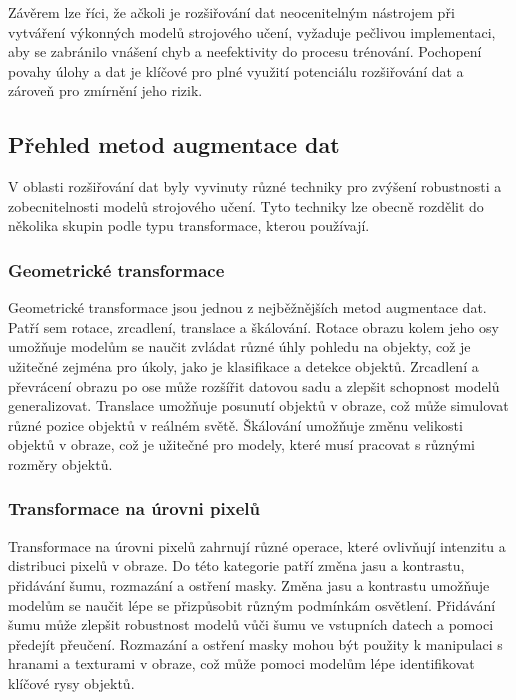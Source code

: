 \documentclass[male,czech,api_ing]{thesis}
\begin{document}
Závěrem lze říci, že ačkoli je rozšiřování dat neocenitelným nástrojem při vytváření výkonných modelů strojového učení, vyžaduje pečlivou implementaci, aby se zabránilo vnášení chyb a neefektivity do procesu trénování. Pochopení povahy úlohy a dat je klíčové pro plné využití potenciálu rozšiřování dat a zároveň pro zmírnění jeho rizik.

\subsection{Přehled metod augmentace dat}
V oblasti rozšiřování dat byly vyvinuty různé techniky pro zvýšení robustnosti a zobecnitelnosti modelů strojového učení. Tyto techniky lze obecně rozdělit do několika skupin podle typu transformace, kterou používají.

\subsubsection{Geometrické transformace}
Geometrické transformace jsou jednou z nejběžnějších metod augmentace dat. Patří sem rotace, zrcadlení, translace a škálování. Rotace obrazu kolem jeho osy umožňuje modelům se naučit zvládat různé úhly pohledu na objekty, což je užitečné zejména pro úkoly, jako je klasifikace a detekce objektů. Zrcadlení a převrácení obrazu po ose může rozšířit datovou sadu a zlepšit schopnost modelů generalizovat. Translace umožňuje posunutí objektů v obraze, což může simulovat různé pozice objektů v reálném světě. Škálování umožňuje změnu velikosti objektů v obraze, což je užitečné pro modely, které musí pracovat s různými rozměry objektů. \cite{AugmentationSurvey}

\subsubsection{Transformace na úrovni pixelů}
Transformace na úrovni pixelů zahrnují různé operace, které ovlivňují intenzitu a distribuci pixelů v obraze. Do této kategorie patří změna jasu a kontrastu, přidávání šumu, rozmazání a ostření masky. Změna jasu a kontrastu umožňuje modelům se naučit lépe se přizpůsobit různým podmínkám osvětlení. Přidávání šumu může zlepšit robustnost modelů vůči šumu ve vstupních datech a pomoci předejít přeučení. Rozmazání a ostření masky mohou být použity k manipulaci s hranami a texturami v obraze, což může pomoci modelům lépe identifikovat klíčové rysy objektů. \cite{AugmentationSurvey}
\end{document}
